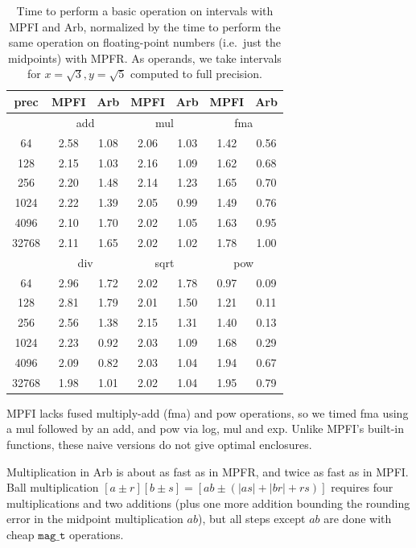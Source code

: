 \documentclass[10pt,journal,compsoc,cspaper]{IEEEtran}
\begin{document}
\begin{table}[!ht]
\caption{Time to perform a basic operation on intervals
with MPFI and Arb, normalized
by the time to perform the same operation on floating-point numbers (i.e.\ just the midpoints) with MPFR.
As operands, we take intervals for $x = \sqrt{3}, y = \sqrt{5}$ computed to full precision.}
\label{tab:timings}
\begin{center}
\renewcommand{\arraystretch}{1.2}
\begin{tabular}{c|cc|cc|cc}
prec  & MPFI & Arb & MPFI & Arb & MPFI & Arb \\ \hline
      & \multicolumn{2}{c|}{add} & \multicolumn{2}{c|}{mul} & \multicolumn{2}{c}{fma} \\ \hline
64    &  2.58 &  1.08 & 2.06 & 1.03 & 1.42 & 0.56 \\
128   &  2.15 &  1.03 & 2.16 & 1.09 & 1.62 & 0.68 \\
256   &  2.20 &  1.48 & 2.14 & 1.23 & 1.65 & 0.70 \\
1024  &  2.22 &  1.39 & 2.05 & 0.99 & 1.49 & 0.76 \\
4096  &  2.10 &  1.70 & 2.02 & 1.05 & 1.63 & 0.95 \\
32768 &  2.11 &  1.65 & 2.02 & 1.02 & 1.78 & 1.00 \\ \hline
      & \multicolumn{2}{c|}{div} & \multicolumn{2}{c|}{sqrt} & \multicolumn{2}{c}{pow} \\ \hline
64    & 2.96 & 1.72 & 2.02 & 1.78 & 0.97 & 0.09 \\
128   & 2.81 & 1.79 & 2.01 & 1.50 & 1.21 & 0.11 \\
256   & 2.56 & 1.38 & 2.15 & 1.31 & 1.40 & 0.13 \\
1024  & 2.23 & 0.92 & 2.03 & 1.09 & 1.68 & 0.29 \\
4096  & 2.09 & 0.82 & 2.03 & 1.04 & 1.94 & 0.67 \\
32768 & 1.98 & 1.01 & 2.02 & 1.04 & 1.95 & 0.79 \\
\end{tabular}%
\end{center}
\end{table}

MPFI lacks fused multiply-add (fma) and pow operations, so we timed fma using
a mul followed by an add, and pow via log, mul and exp.
Unlike MPFI's built-in functions, these naive versions do not give
optimal enclosures.

Multiplication in Arb is about as fast as in MPFR, and twice as fast as
in MPFI. Ball multiplication
$[a \pm r] [b \pm s] = [ab \pm (|as| + |br| + rs)]$ requires four
multiplications and two additions (plus one more addition
bounding the rounding error in the midpoint multiplication $ab$),
but all steps except $ab$ are done with cheap $\texttt{mag\_t}$ operations.
\end{document}

